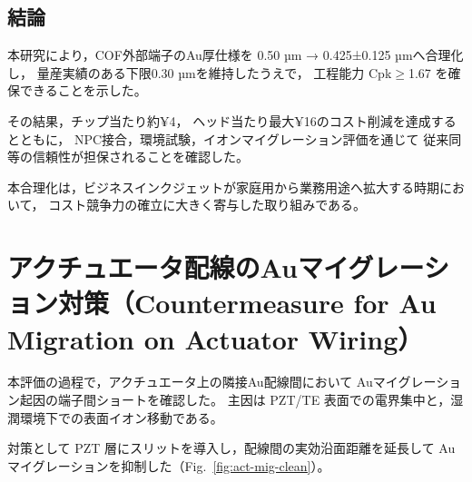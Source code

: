 \documentclass[conference]{IEEEtran}
\begin{document}
\subsection{結論}
本研究により，COF外部端子のAu厚仕様を
0.50 µm → 0.425±0.125 µmへ合理化し，
量産実績のある下限0.30 µmを維持したうえで，
工程能力 Cpk$\geq$1.67 を確保できることを示した。  

その結果，チップ当たり約¥4，
ヘッド当たり最大¥16のコスト削減を達成するとともに，
NPC接合，環境試験，イオンマイグレーション評価を通じて
従来同等の信頼性が担保されることを確認した。  

本合理化は，ビジネスインクジェットが家庭用から業務用途へ拡大する時期において，
コスト競争力の確立に大きく寄与した取り組みである。

\appendices
\section{アクチュエータ配線のAuマイグレーション対策（Countermeasure for Au Migration on Actuator Wiring）}

本評価の過程で，アクチュエータ上の隣接Au配線間において
Auマイグレーション起因の端子間ショートを確認した。
主因は PZT/TE 表面での電界集中と，湿潤環境下での表面イオン移動である。

対策として PZT 層にスリットを導入し，配線間の実効沿面距離を延長して
Auマイグレーションを抑制した（Fig.~\ref{fig:act-mig-clean}）。
\end{document}
